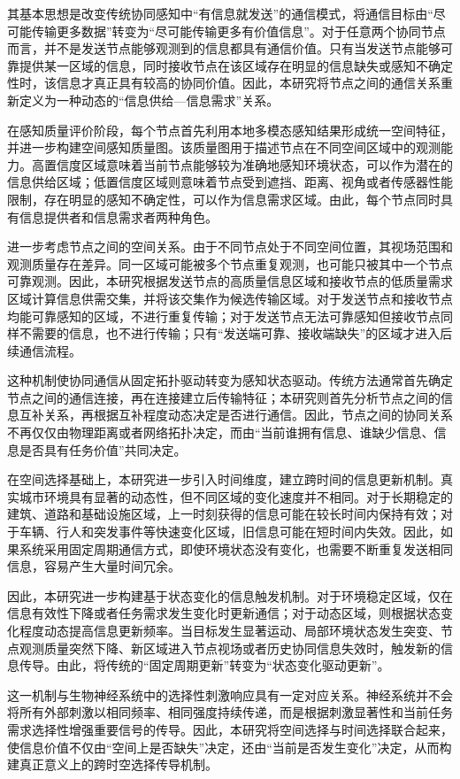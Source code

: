 其基本思想是改变传统协同感知中“有信息就发送”的通信模式，将通信目标由“尽可能传输更多数据”转变为“尽可能传输更多有价值信息”。对于任意两个协同节点而言，并不是发送节点能够观测到的信息都具有通信价值。只有当发送节点能够可靠提供某一区域的信息，同时接收节点在该区域存在明显的信息缺失或感知不确定性时，该信息才真正具有较高的协同价值。因此，本研究将节点之间的通信关系重新定义为一种动态的“信息供给—信息需求”关系。

在感知质量评价阶段，每个节点首先利用本地多模态感知结果形成统一空间特征，并进一步构建空间感知质量图。该质量图用于描述节点在不同空间区域中的观测能力。高置信度区域意味着当前节点能够较为准确地感知环境状态，可以作为潜在的信息供给区域；低置信度区域则意味着节点受到遮挡、距离、视角或者传感器性能限制，存在明显的感知不确定性，可以作为信息需求区域。由此，每个节点同时具有信息提供者和信息需求者两种角色。

进一步考虑节点之间的空间关系。由于不同节点处于不同空间位置，其视场范围和观测质量存在差异。同一区域可能被多个节点重复观测，也可能只被其中一个节点可靠观测。因此，本研究根据发送节点的高质量信息区域和接收节点的低质量需求区域计算信息供需交集，并将该交集作为候选传输区域。对于发送节点和接收节点均能可靠感知的区域，不进行重复传输；对于发送节点无法可靠感知但接收节点同样不需要的信息，也不进行传输；只有“发送端可靠、接收端缺失”的区域才进入后续通信流程。

这种机制使协同通信从固定拓扑驱动转变为感知状态驱动。传统方法通常首先确定节点之间的通信连接，再在连接建立后传输特征；本研究则首先分析节点之间的信息互补关系，再根据互补程度动态决定是否进行通信。因此，节点之间的协同关系不再仅仅由物理距离或者网络拓扑决定，而由“当前谁拥有信息、谁缺少信息、信息是否具有任务价值”共同决定。

在空间选择基础上，本研究进一步引入时间维度，建立跨时间的信息更新机制。真实城市环境具有显著的动态性，但不同区域的变化速度并不相同。对于长期稳定的建筑、道路和基础设施区域，上一时刻获得的信息可能在较长时间内保持有效；对于车辆、行人和突发事件等快速变化区域，旧信息可能在短时间内失效。因此，如果系统采用固定周期通信方式，即使环境状态没有变化，也需要不断重复发送相同信息，容易产生大量时间冗余。

因此，本研究进一步构建基于状态变化的信息触发机制。对于环境稳定区域，仅在信息有效性下降或者任务需求发生变化时更新通信；对于动态区域，则根据状态变化程度动态提高信息更新频率。当目标发生显著运动、局部环境状态发生突变、节点观测质量突然下降、新区域进入节点视场或者历史协同信息失效时，触发新的信息传导。由此，将传统的“固定周期更新”转变为“状态变化驱动更新”。

这一机制与生物神经系统中的选择性刺激响应具有一定对应关系。神经系统并不会将所有外部刺激以相同频率、相同强度持续传递，而是根据刺激显著性和当前任务需求选择性增强重要信号的传导。因此，本研究将空间选择与时间选择联合起来，使信息价值不仅由“空间上是否缺失”决定，还由“当前是否发生变化”决定，从而构建真正意义上的跨时空选择传导机制。

